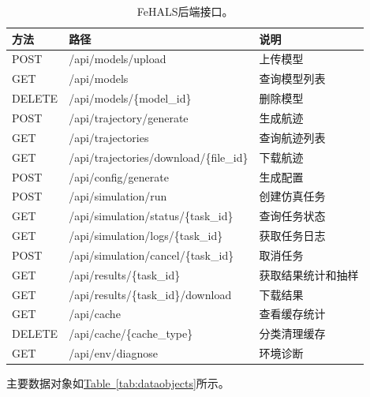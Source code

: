 \documentclass[a4paper,fleqn]{cas-sc}
\newcommand{\refTab}[1]{\hyperref[#1]{Table~\ref*{#1}}}
\begin{document}
\begin{table}[pos=!htbp]
    \centering
    \caption{FeHALS后端接口。}
    \begin{tabular*}{\textwidth}{@{\extracolsep{\fill}} l l l}
        \toprule
        方法 & 路径 & 说明 \\
        \midrule
        POST & /api/models/upload & 上传模型 \\
        GET & /api/models & 查询模型列表 \\
        DELETE & /api/models/\{model\_id\} & 删除模型 \\
        POST & /api/trajectory/generate & 生成航迹 \\
        GET & /api/trajectories & 查询航迹列表 \\
        GET & /api/trajectories/download/\{file\_id\} & 下载航迹 \\
        POST & /api/config/generate & 生成配置 \\
        POST & /api/simulation/run & 创建仿真任务 \\
        GET & /api/simulation/status/\{task\_id\} & 查询任务状态 \\
        GET & /api/simulation/logs/\{task\_id\} & 获取任务日志 \\
        POST & /api/simulation/cancel/\{task\_id\} & 取消任务 \\
        GET & /api/results/\{task\_id\} & 获取结果统计和抽样 \\
        GET & /api/results/\{task\_id\}/download & 下载结果 \\
        GET & /api/cache & 查看缓存统计 \\
        DELETE & /api/cache/\{cache\_type\} & 分类清理缓存 \\
        GET & /api/env/diagnose & 环境诊断 \\
        \bottomrule
    \end{tabular*}
    \label{tab:apis}
\end{table}

主要数据对象如\refTab{tab:dataobjects}所示。
\end{document}
